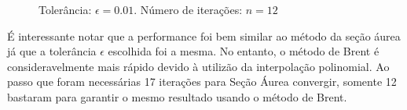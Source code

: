 \documentclass[a4paper,12pt,utf8x,notitlepage]{article}
\begin{document}
\begin{figure}[h!]
\centering
\scalebox{0.85}{}
\caption{Tolerância: $\epsilon =  0.01$. Número de iterações: $n = 12$}
\label{fig:brent}
\end{figure}

É interessante notar que a performance foi bem similar ao método da seção áurea já que a tolerância $\epsilon$ escolhida foi a mesma. No entanto, o método de Brent é consideravelmente mais rápido devido à utilizão da interpolação polinomial. Ao passo que foram necessárias 17 iterações para Seção Áurea convergir, somente 12 bastaram para garantir o mesmo resultado usando o método de Brent.

% 



\end{document}
